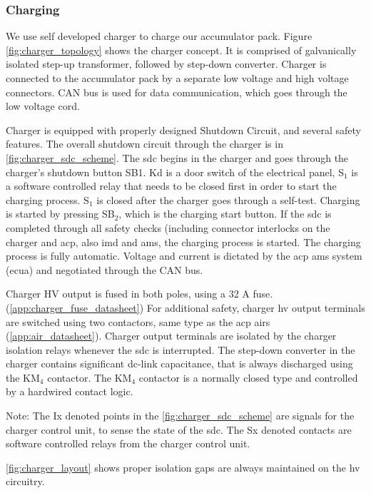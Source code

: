 \subsubsection{Charging}
We use self developed charger to charge our accumulator pack. Figure \ref{fig:charger_topology} shows the charger concept. It is comprised of galvanically isolated step-up transformer, followed by step-down converter. Charger is connected to the accumulator pack by a separate low voltage and high voltage connectors. CAN bus is used for data communication, which goes through the low voltage cord. 

Charger is equipped with properly designed Shutdown Circuit, and several safety features. The overall shutdown circuit through the charger is in \ref{fig:charger_sdc_scheme}. The \gls{sdc} begins in the charger and goes through the charger's shutdown button SB1. Kd is a door switch of the electrical panel, S$_1$ is a software controlled relay that needs to be closed first in order to start the charging process. S$_1$ is closed after the charger goes through a self-test. Charging is started by pressing SB$_2$, which is the charging start button. If the \gls{sdc} is completed through all safety checks (including connector interlocks on the charger and \gls{acp}, also \gls{imd} and \gls{ams}, the charging process is started. The charging process is fully automatic. Voltage and current is dictated by the \gls{acp} \gls{ams} system (\gls{ecua}) and negotiated through the CAN bus.

Charger HV output is fused in both poles, using a 32 A fuse. (\ref{app:charger_fuse_datasheet}) For additional safety, charger \gls{hv} output terminals are switched using two contactors, same type as the \gls{acp} \glspl{air} (\ref{app:air_datasheet}). Charger output terminals are isolated by the charger isolation relays whenever the \gls{sdc} is interrupted. The step-down converter in the charger contains significant dc-link capacitance, that is always discharged using the KM$_4$ contactor. The KM$_4$ contactor is a normally closed type and controlled by a hardwired contact logic.

Note: The Ix denoted points in the \ref{fig:charger_sdc_scheme} are signals for the charger control unit, to sense the state of the \gls{sdc}. The Sx denoted contacts are software controlled relays from the charger control unit.

\ref{fig:charger_layout} shows proper isolation gaps are always maintained on the \gls{hv} circuitry.


